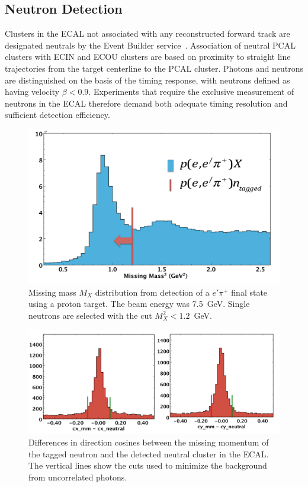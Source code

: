 \subsection{Neutron Detection}

Clusters in the ECAL not associated with any reconstructed forward track are designated neutrals by the Event
Builder service~\cite{nim:recon}. Association of neutral PCAL clusters with ECIN and ECOU clusters are based on
proximity to straight line trajectories from the target centerline to the PCAL cluster. Photons and neutrons are
distinguished on the basis of the timing response, with neutrons defined as having velocity $\beta < 0.9$.
Experiments that require the exclusive measurement of neutrons in the ECAL therefore demand both adequate
timing resolution and sufficient detection efficiency. 

\begin{figure}[h]
\centering
\includegraphics[width=1.0\columnwidth,keepaspectratio]{img/S10_4_0.png}
\caption[]{Missing mass $M_X$ distribution from detection of a $e'\pi^+$ final state using a proton target. The
  beam energy was 7.5~GeV. Single neutrons are selected with the cut $M_X^2 < 1.2$~GeV.}
\label{fig:S10_4_0}
\end{figure}

\begin{figure}[h]
\centering
\includegraphics[width=1.0\columnwidth,keepaspectratio]{img/S10_4_1.png}
\caption[]{Differences in direction cosines between the missing momentum of the tagged neutron and the detected
  neutral cluster in the ECAL. The vertical lines show the cuts used to minimize the background from uncorrelated
  photons.}
\label{fig:S10_4_1}
\end{figure}

